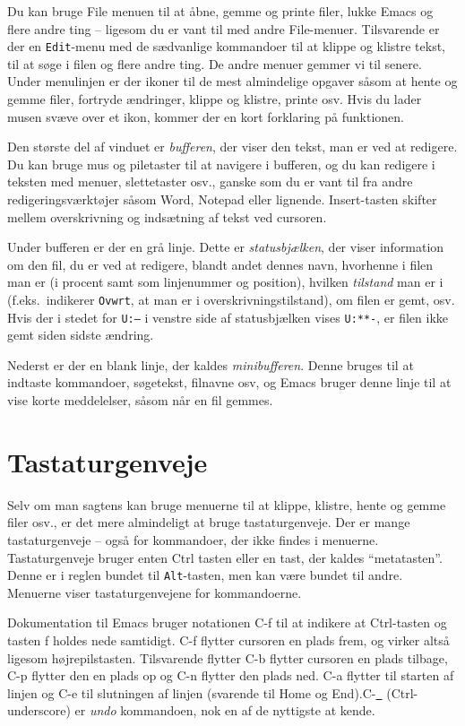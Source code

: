 \documentclass[a4paper]{article}
\begin{document}
Du kan bruge \textsf{File} menuen til at åbne, gemme og printe filer,
lukke Emacs og flere andre ting -- ligesom du er vant til med andre
\textsf{File}-menuer.  Tilsvarende er der en \texttt{Edit}-menu med de
sædvanlige kommandoer til at klippe og klistre tekst, til at søge i
filen og flere andre ting.  De andre menuer gemmer vi til senere.
Under menulinjen er der ikoner til de mest almindelige opgaver såsom
at hente og gemme filer, fortryde ændringer, klippe og klistre, printe
osv.  Hvis du lader musen svæve over et ikon, kommer der en kort
forklaring på funktionen.

Den største del af vinduet er \emph{bufferen}, der viser den tekst,
man er ved at redigere.  Du kan bruge mus og piletaster til at
navigere i bufferen, og du kan redigere i teksten med menuer,
slettetaster osv., ganske som du er vant til fra andre
redigeringsværktøjer såsom Word, Notepad eller lignende.
\textsf{Insert}-tasten skifter mellem overskrivning og indsætning af
tekst ved cursoren.

Under bufferen er der en grå linje.  Dette er \emph{statusbjælken},
der viser information om den fil, du er ved at redigere, blandt andet
dennes navn, hvorhenne i filen man er (i procent samt som linjenummer
og position), hvilken \emph{tilstand} man er i (f.eks.\ indikerer
\texttt{Ovwrt}, at man er i overskrivningstilstand), om filen er gemt,
osv. Hvis der i stedet for \texttt{U:---} i venstre side af
statusbjælken vises \texttt{U:**-}, er filen ikke gemt siden sidste
ændring.

Nederst er der en blank linje, der kaldes \emph{minibufferen}.  Denne
bruges til at indtaste kommandoer, søgetekst, filnavne osv, og Emacs
bruger denne linje til at vise korte meddelelser, såsom når en fil
gemmes.

\section{Tastaturgenveje}\label{genveje}

Selv om man sagtens kan bruge menuerne til at klippe, klistre, hente
og gemme filer osv., er det mere almindeligt at bruge tastaturgenveje.
Der er mange tastaturgenveje -- også for kommandoer, der ikke findes i
menuerne.  Tastaturgenveje bruger enten \textsf{Ctrl} tasten eller en
tast, der kaldes ``metatasten''.  Denne er i reglen bundet til
\texttt{Alt}-tasten, men kan være bundet til andre.  Menuerne viser
tastaturgenvejene for kommandoerne.

Dokumentation til Emacs bruger notationen \textsf{C-f} til at indikere
at \textsf{Ctrl}-tasten og tasten \textsf{f} holdes nede samtidigt.
\textsf{C-f} flytter cursoren en plads frem, og virker altså ligesom
højrepilstasten.  Tilsvarende flytter \textsf{C-b} flytter cursoren en
plads tilbage, \textsf{C-p} flytter den en plads op og \textsf{C-n}
flytter den plads ned. \textsf{C-a} flytter til starten af linjen og
\textsf{C-e} til slutningen af linjen (svarende til \textsf{Home} og
\textsf{End}).\newline \textsf{C-\underline{~}}
(\textsf{Ctrl}-underscore) er \emph{undo} kommandoen, nok en af de
nyttigste at kende.
\end{document}
